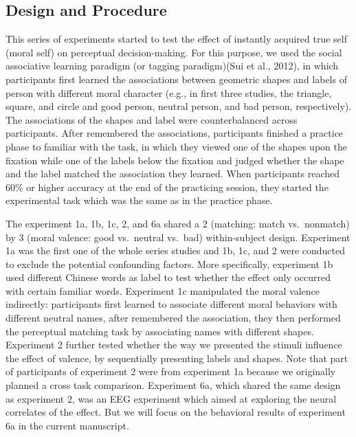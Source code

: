 \documentclass[
  english,
  man]{apa6}
\begin{document}
\hypertarget{design-and-procedure}{%
\subsection{Design and Procedure}\label{design-and-procedure}}

This series of experiments started to test the effect of instantly acquired true self (moral self) on perceptual decision-making. For this purpose, we used the social associative learning paradigm (or tagging paradigm)(Sui et al., 2012), in which participants first learned the associations between geometric shapes and labels of person with different moral character (e.g., in first three studies, the triangle, square, and circle and good person, neutral person, and bad person, respectively). The associations of the shapes and label were counterbalanced across participants. After remembered the associations, participants finished a practice phase to familiar with the task, in which they viewed one of the shapes upon the fixation while one of the labels below the fixation and judged whether the shape and the label matched the association they learned. When participants reached 60\% or higher accuracy at the end of the practicing session, they started the experimental task which was the same as in the practice phase.

The experiment 1a, 1b, 1c, 2, and 6a shared a 2 (matching: match vs.~nonmatch) by 3 (moral valence: good vs.~neutral vs.~bad) within-subject design. Experiment 1a was the first one of the whole series studies and 1b, 1c, and 2 were conducted to exclude the potential confounding factors. More specifically, experiment 1b used different Chinese words as label to test whether the effect only occurred with certain familiar words. Experiment 1c manipulated the moral valence indirectly: participants first learned to associate different moral behaviors with different neutral names, after remembered the association, they then performed the perceptual matching task by associating names with different shapes. Experiment 2 further tested whether the way we presented the stimuli influence the effect of valence, by sequentially presenting labels and shapes. Note that part of participants of experiment 2 were from experiment 1a because we originally planned a cross task comparison. Experiment 6a, which shared the same design as experiment 2, was an EEG experiment which aimed at exploring the neural correlates of the effect. But we will focus on the behavioral results of experiment 6a in the current manuscript.
\end{document}
